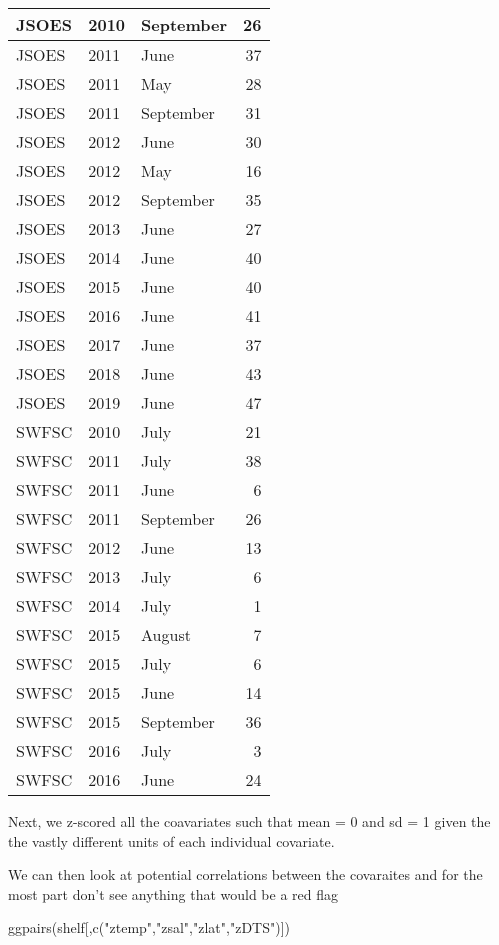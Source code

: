 \documentclass[
]{article}
\newenvironment{Shaded}{\begin{snugshade}}{\end{snugshade}}
\newcommand{\FunctionTok}[1]{\textcolor[rgb]{0.00,0.00,0.00}{#1}}
\newcommand{\NormalTok}[1]{#1}
\newcommand{\StringTok}[1]{\textcolor[rgb]{0.31,0.60,0.02}{#1}}
\begin{document}
\begin{table}
\begin{tabular}[t]{l|l|l|r}
\hline
JSOES & 2010 & September & 26\\
\hline
JSOES & 2011 & June & 37\\
\hline
JSOES & 2011 & May & 28\\
\hline
JSOES & 2011 & September & 31\\
\hline
JSOES & 2012 & June & 30\\
\hline
JSOES & 2012 & May & 16\\
\hline
JSOES & 2012 & September & 35\\
\hline
JSOES & 2013 & June & 27\\
\hline
JSOES & 2014 & June & 40\\
\hline
JSOES & 2015 & June & 40\\
\hline
JSOES & 2016 & June & 41\\
\hline
JSOES & 2017 & June & 37\\
\hline
JSOES & 2018 & June & 43\\
\hline
JSOES & 2019 & June & 47\\
\hline
SWFSC & 2010 & July & 21\\
\hline
SWFSC & 2011 & July & 38\\
\hline
SWFSC & 2011 & June & 6\\
\hline
SWFSC & 2011 & September & 26\\
\hline
SWFSC & 2012 & June & 13\\
\hline
SWFSC & 2013 & July & 6\\
\hline
SWFSC & 2014 & July & 1\\
\hline
SWFSC & 2015 & August & 7\\
\hline
SWFSC & 2015 & July & 6\\
\hline
SWFSC & 2015 & June & 14\\
\hline
SWFSC & 2015 & September & 36\\
\hline
SWFSC & 2016 & July & 3\\
\hline
SWFSC & 2016 & June & 24\\
\hline
\end{tabular}
\end{table}

Next, we z-scored all the coavariates such that mean = 0 and sd = 1
given the the vastly different units of each individual covariate.

We can then look at potential correlations between the covaraites and
for the most part don't see anything that would be a red flag

\begin{Shaded}
\begin{Highlighting}[]
\FunctionTok{ggpairs}\NormalTok{(shelf[,}\FunctionTok{c}\NormalTok{(}\StringTok{"ztemp"}\NormalTok{,}\StringTok{"zsal"}\NormalTok{,}\StringTok{"zlat"}\NormalTok{,}\StringTok{"zDTS"}\NormalTok{)])}
\end{Highlighting}
\end{Shaded}
\end{document}
